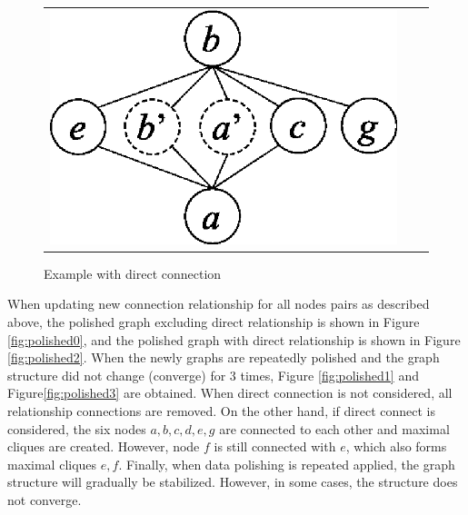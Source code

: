 \begin{figure}[htbp]
\begin{center}
\begin{tabular}{ccc}
\begin{minipage}{0.3\hsize}
\begin{center}
\includegraphics[scale=0.5]{./ab3.eps}
\caption{Example with direct connection\label{fig:ab3}}
\end{center}
\end{minipage}

\end{tabular}
\end{center}
\end{figure}


When updating new connection relationship for all nodes pairs as described above, the polished graph excluding direct relationship is shown in Figure \ref{fig:polished0}, and the polished graph with direct relationship is shown in Figure \ref{fig:polished2}. When the newly graphs are repeatedly polished and the graph structure did not change (converge) for 3 times, Figure \ref{fig:polished1} and Figure\ref{fig:polished3} are obtained. 
When direct connection is not considered, all relationship connections are removed. On the other hand, if direct connect is considered, the six nodes $a,b,c,d,e,g$ are connected to each other and maximal cliques are created. 
However, node $f$ is still connected with $e$, which also forms maximal cliques $e,f$.  Finally, when data polishing is repeated applied, the graph structure will gradually be stabilized. However, in some cases, the structure does not converge. 


